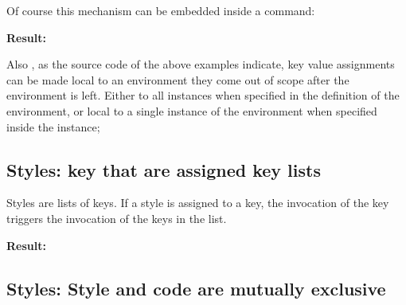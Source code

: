 \documentclass{scrartcl}
\newenvironment{result}
    {\noindent\ignorespaces\textbf{Result:}\newline}
    {\par\noindent\ignorespacesafterend}
\begin{document}
Of course this mechanism can be embedded inside a command:
\begin{latex}

\newcommand{\testcommand}[1][]{\pgfkeys{#1}}

\testcommand 
\testcommand[testkey=ho]
\end{latex}

\begin{result}

\newcommand{\testcommand}[1][]{\pgfkeys{#1}}
\testcommand 
\testcommand[testkey=ho]
\end{result}

Also , as the source code of the above examples indicate,
key value assignments can be made local to an environment
they come out of scope after the environment is left.
Either to all instances when specified in the definition of the environment,
or local to a single instance of the environment when specified inside the instance;

\subsection{Styles: key that are assigned key lists}

Styles are lists of keys. If a style is assigned to a key, the invocation
of the key triggers the invocation of the keys in the list.

\begin{latex}

\end{latex}

\begin{result}

\end{result}


\subsection{Styles: Style and code are mutually exclusive}
\end{document}

